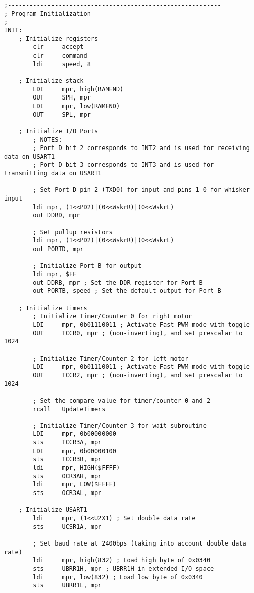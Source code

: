\documentclass[12pt,letterpaper]{article}
\begin{document}
\begin{verbatim}
;-----------------------------------------------------------
; Program Initialization
;-----------------------------------------------------------
INIT:
    ; Initialize registers
        clr     accept
        clr     command
        ldi     speed, 8

    ; Initialize stack
        LDI     mpr, high(RAMEND)
        OUT     SPH, mpr
        LDI     mpr, low(RAMEND)
        OUT     SPL, mpr

    ; Initialize I/O Ports
        ; NOTES:
        ; Port D bit 2 corresponds to INT2 and is used for receiving data on USART1
        ; Port D bit 3 corresponds to INT3 and is used for transmitting data on USART1

        ; Set Port D pin 2 (TXD0) for input and pins 1-0 for whisker input
        ldi mpr, (1<<PD2)|(0<<WskrR)|(0<<WskrL)
        out DDRD, mpr

        ; Set pullup resistors
        ldi mpr, (1<<PD2)|(0<<WskrR)|(0<<WskrL)
        out PORTD, mpr

        ; Initialize Port B for output
        ldi mpr, $FF
        out DDRB, mpr ; Set the DDR register for Port B
        out PORTB, speed ; Set the default output for Port B

    ; Initialize timers
        ; Initialize Timer/Counter 0 for right motor
        LDI     mpr, 0b01110011 ; Activate Fast PWM mode with toggle
        OUT     TCCR0, mpr ; (non-inverting), and set prescalar to 1024
        
        ; Initialize Timer/Counter 2 for left motor
        LDI     mpr, 0b01110011 ; Activate Fast PWM mode with toggle
        OUT     TCCR2, mpr ; (non-inverting), and set prescalar to 1024

        ; Set the compare value for timer/counter 0 and 2
        rcall   UpdateTimers

        ; Initialize Timer/Counter 3 for wait subroutine
        LDI     mpr, 0b00000000
        sts     TCCR3A, mpr
        LDI     mpr, 0b00000100
        sts     TCCR3B, mpr
        ldi     mpr, HIGH($FFFF)
        sts     OCR3AH, mpr
        ldi     mpr, LOW($FFFF)
        sts     OCR3AL, mpr

    ; Initialize USART1
        ldi     mpr, (1<<U2X1) ; Set double data rate
        sts     UCSR1A, mpr

        ; Set baud rate at 2400bps (taking into account double data rate)
        ldi     mpr, high(832) ; Load high byte of 0x0340
        sts     UBRR1H, mpr ; UBRR1H in extended I/O space
        ldi     mpr, low(832) ; Load low byte of 0x0340
        sts     UBRR1L, mpr


\end{verbatim}
\end{document}
